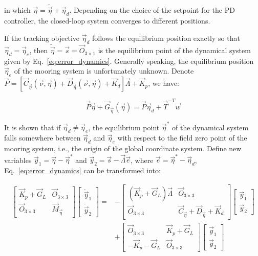 \begin{sloppypar}
\noindent in which $\vec{\eta} = \widetilde{\vec{\eta}} + \vec{\eta}_d$. Depending on the choice of the setpoint for the PD controller, the closed-loop system converges to different positions.

If the tracking objective $\vec{\eta}_d$ follows the equilibrium position exactly so that $\vec{\eta}_d = \vec{\eta}_e$, then $\widetilde{\vec{\eta}} = \vec{s} = \vec{O}_{3\times1}$ is the equilibrium point of the dynamical system given by Eq.~\ref{eq:error_dynamics}. Generally speaking, the equilibrium position $\vec{\eta}_e$ of the mooring system is unfortunately unknown. Denote $\vec{P} = \left[ \vec{C}_{\vec{\eta}}(\vec{\nu}, \vec{\eta}) + \vec{D}_{\vec{\eta}}(\vec{\nu}, \vec{\eta}) + \vec{K}_d \right] \vec{\Lambda}+ \vec{K}_p$, we have:

\begin{equation}
\vec{P}\vec{\eta} + \vec{G}_{\vec{\eta}}(\vec{\eta}) = \vec{P}\vec{\eta}_d + \vec{T}^{-T}\vec{w} 
\end{equation}

\noindent It is shown that if $\vec{\eta}_d \neq \vec{\eta}_e$, the equilibrium point $\vec{\eta}^*$ of the dynamical system falls somewhere between $\vec{\eta}_d$ and $\vec{\eta}_e$ with respect to the field zero point of the mooring system, i.e., the origin of the global coordinate system. Define new variables $\vec{y}_1 = \vec{\eta} - \vec{\eta}^*$ and $\vec{y}_2 = \vec{s} - \vec{\Lambda}\vec{e}$, where $\vec{e} = \vec{\eta}^* - \vec{\eta}_d$, Eq.~\ref{eq:error_dynamics} can be transformed into:

\begin{equation}
\begin{aligned}
\begin{bmatrix}
\vec{K}_p + \vec{G}_L & \vec{O}_{3\times3} \\
\vec{O}_{3\times3} & \vec{M}_{\vec{\eta}}
\end{bmatrix} \begin{bmatrix}
\dot{\vec{y}}_1 \\
\dot{\vec{y}}_2
\end{bmatrix} = &-\begin{bmatrix}
(\vec{K}_p + \vec{G}_L)\vec{\Lambda} & \vec{O}_{3\times3} \\
\vec{O}_{3\times3} & \vec{C}_{\vec{\eta}} + \vec{D}_{\vec{\eta}} + \vec{K}_d
\end{bmatrix} \begin{bmatrix}
\vec{y}_1 \\
\vec{y}_2
\end{bmatrix} \\
&+ \begin{bmatrix}
\vec{O}_{3\times3} & \vec{K}_p + \vec{G}_L  \\
-\vec{K}_p - \vec{G}_L  & \vec{O}_{3\times3}
\end{bmatrix} \begin{bmatrix}
\vec{y}_1 \\
\vec{y}_2
\end{bmatrix}
\end{aligned}
\end{equation}


\end{sloppypar}
